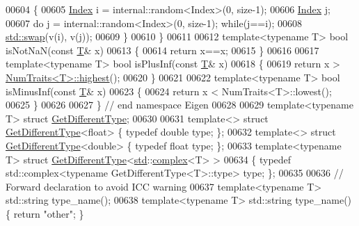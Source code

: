 \begin{DoxyCode}
00604   \{
00605     \hyperlink{namespace_eigen_a62e77e0933482dafde8fe197d9a2cfde}{Index} i = internal::random<Index>(0, size-1);
00606     \hyperlink{namespace_eigen_a62e77e0933482dafde8fe197d9a2cfde}{Index} j;
00607     \textcolor{keywordflow}{do} j = internal::random<Index>(0, size-1); \textcolor{keywordflow}{while}(j==i);
00608     \hyperlink{endian_8c_a3ca5ecd34b04d6a243c054ac3a57f68d}{std::swap}(v(i), v(j));
00609   \}
00610 \}
00611 
00612 \textcolor{keyword}{template}<\textcolor{keyword}{typename} T> \textcolor{keywordtype}{bool} isNotNaN(\textcolor{keyword}{const} \hyperlink{group___sparse_core___module}{T}& x)
00613 \{
00614   \textcolor{keywordflow}{return} x==x;
00615 \}
00616 
00617 \textcolor{keyword}{template}<\textcolor{keyword}{typename} T> \textcolor{keywordtype}{bool} isPlusInf(\textcolor{keyword}{const} \hyperlink{group___sparse_core___module}{T}& x)
00618 \{
00619   \textcolor{keywordflow}{return} x > \hyperlink{group___core___module_struct_eigen_1_1_num_traits}{NumTraits<T>::highest}();
00620 \}
00621 
00622 \textcolor{keyword}{template}<\textcolor{keyword}{typename} T> \textcolor{keywordtype}{bool} isMinusInf(\textcolor{keyword}{const} \hyperlink{group___sparse_core___module}{T}& x)
00623 \{
00624   \textcolor{keywordflow}{return} x < NumTraits<T>::lowest();
00625 \}
00626 
00627 \} \textcolor{comment}{// end namespace Eigen}
00628 
00629 \textcolor{keyword}{template}<\textcolor{keyword}{typename} T> \textcolor{keyword}{struct }\hyperlink{struct_get_different_type}{GetDifferentType};
00630 
00631 \textcolor{keyword}{template}<> \textcolor{keyword}{struct }\hyperlink{struct_get_different_type}{GetDifferentType}<float> \{ \textcolor{keyword}{typedef} \textcolor{keywordtype}{double} type; \};
00632 \textcolor{keyword}{template}<> \textcolor{keyword}{struct }\hyperlink{struct_get_different_type}{GetDifferentType}<double> \{ \textcolor{keyword}{typedef} \textcolor{keywordtype}{float} type; \};
00633 \textcolor{keyword}{template}<\textcolor{keyword}{typename} T> \textcolor{keyword}{struct }\hyperlink{struct_get_different_type}{GetDifferentType}<\hyperlink{namespacestd}{std}::\hyperlink{structcomplex}{complex}<T> >
00634 \{ \textcolor{keyword}{typedef} std::complex<typename GetDifferentType<T>::type> type; \};
00635 
00636 \textcolor{comment}{// Forward declaration to avoid ICC warning}
00637 \textcolor{keyword}{template}<\textcolor{keyword}{typename} T> std::string type\_name();
00638 \textcolor{keyword}{template}<\textcolor{keyword}{typename} T> std::string type\_name()                    \{ \textcolor{keywordflow}{return} \textcolor{stringliteral}{"other"}; \}

\end{DoxyCode}
